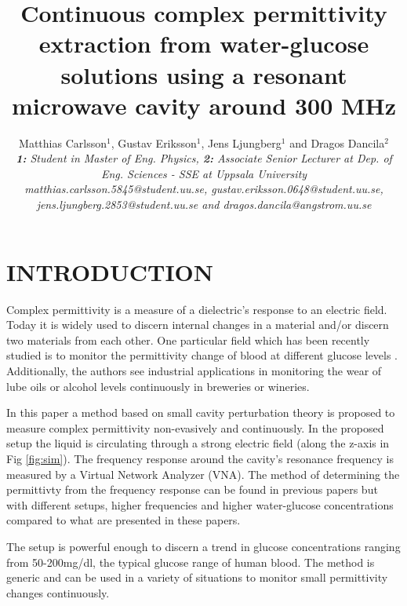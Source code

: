 \documentclass[10pt,final,conference,a4paper,twocolumn]{IEEEtran_AntennEMB_GigaHertz2016}
\begin{document}
\title{Continuous complex permittivity extraction from water-glucose solutions using a resonant microwave cavity around 300 MHz}

\author{Matthias Carlsson$^1$, Gustav Eriksson$^1$, Jens Ljungberg$^1$ and Dragos Dancila$^2$ \\
\em \small \textbf{1:} Student in Master of Eng. Physics, \textbf{2:} Associate Senior Lecturer at Dep. of Eng. Sciences - SSE at Uppsala University \\
\small matthias.carlsson.5845@student.uu.se, gustav.eriksson.0648@student.uu.se, \\
\small jens.ljungberg.2853@student.uu.se and dragos.dancila@angstrom.uu.se
}

\maketitle
\section{INTRODUCTION}
 Complex permittivity is a measure of a dielectric's response to an electric field. Today it is widely used to discern internal changes in a material and/or discern two materials from each other. One particular field which has been recently studied is to monitor the permittivity change of blood at different glucose levels \cite{c2}. Additionally, the authors see industrial applications in monitoring the wear of lube oils or alcohol levels continuously in breweries or wineries.
 
 In this paper a method based on small cavity perturbation theory \cite{c3} is proposed to measure complex permittivity non-evasively and continuously. In the proposed setup the liquid is circulating through a strong electric field (along the z-axis in Fig \ref{fig:sim}). The frequency response around the cavity's resonance frequency is measured by a Virtual Network Analyzer (VNA). The method of determining the permittivty from the frequency response can be found in previous papers \cite{c2}\cite{c1} but with different setups, higher frequencies and higher water-glucose concentrations compared to what are presented in these papers.
 
 The setup is powerful enough to discern a trend in glucose concentrations ranging from 50-200mg/dl, the typical glucose range of human blood. The method is generic and can be used in a variety of situations to monitor small permittivity changes continuously.
\end{document}
